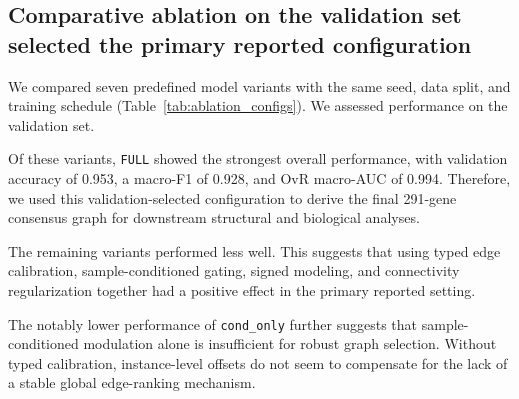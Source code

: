 \documentclass[unnumsec,webpdf,modern,large]{oup-authoring-template}
\begin{document}
\subsection{Comparative ablation on the validation set selected the primary reported configuration}
We compared seven predefined model variants with the same seed, data split, and training schedule (Table~\ref{tab:ablation_configs}). We assessed performance on the validation set.

Of these variants, \texttt{FULL} showed the strongest overall performance, with validation accuracy of 0.953, a macro-F1 of 0.928, and OvR macro-AUC of 0.994. Therefore, we used this validation-selected configuration to derive the final 291-gene consensus graph for downstream structural and biological analyses.

The remaining variants performed less well. This suggests that using typed edge calibration, sample-conditioned gating, signed modeling, and connectivity regularization together had a positive effect in the primary reported setting.

\begin{table}[!htbp]
\centering
\caption{Comparative ablation across seven predefined architectural variants. The reported metrics correspond to validation-set performance and were used to select the primary configuration.}
\label{tab:ablation_configs}
\end{table}

The notably lower performance of \texttt{cond\_only} further suggests that sample-conditioned modulation alone is insufficient for robust graph selection. Without typed calibration, instance-level offsets do not seem to compensate for the lack of a stable global edge-ranking mechanism.
\end{document}
